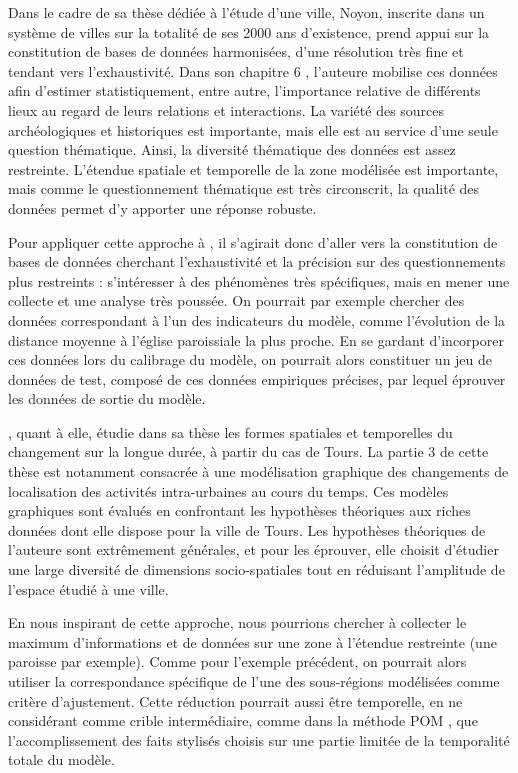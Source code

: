 Dans le cadre de sa thèse dédiée à l'étude d'une ville, Noyon, inscrite dans un système de villes sur la totalité de ses 2000 ans d'existence, \textcite{gravier_deux_2018} prend appui sur la constitution de bases de données harmonisées, d'une résolution très fine et tendant vers l'exhaustivité.
Dans son chapitre 6 \autocite[pp.231--295~]{gravier_deux_2018}, l'auteure mobilise ces données afin d'estimer statistiquement, entre autre, l'importance relative de différents lieux au regard de leurs relations et interactions.
La variété des sources archéologiques et historiques est importante, mais elle est au service d'une seule question thématique.
Ainsi, la diversité thématique des données est assez restreinte.
L'étendue spatiale et temporelle de la zone modélisée est importante, mais comme le questionnement thématique est très circonscrit, la qualité des données permet d'y apporter une réponse robuste.

Pour appliquer cette approche à \simfeodal{}, il s'agirait donc d'aller vers la constitution de bases de données cherchant l'exhaustivité et la précision sur des questionnements plus restreints :
	s'intéresser à des phénomènes très spécifiques, mais en mener une collecte et une analyse très poussée.
On pourrait par exemple chercher des données correspondant à l'un des indicateurs du modèle, comme l'évolution de la distance moyenne à l'église paroissiale la plus proche.
En se gardant d'incorporer ces données lors du calibrage du modèle, on pourrait alors constituer un jeu de données de test, composé de ces données empiriques précises, par lequel éprouver les données de sortie du modèle.

\textcite{nahassia_formes_2019}, quant à elle, étudie dans sa thèse les formes spatiales et temporelles du changement sur la longue durée, à partir du cas de Tours.
La partie 3 \autocite[pp.~239--394]{nahassia_formes_2019} de cette thèse est notamment consacrée à une modélisation graphique des changements de localisation des activités intra-urbaines au cours du temps.
Ces modèles graphiques sont évalués en confrontant les hypothèses théoriques aux riches données dont elle dispose pour la ville de Tours.
Les hypothèses théoriques de l'auteure sont extrêmement générales, et pour les éprouver, elle choisit d'étudier une large diversité de dimensions socio-spatiales tout en réduisant l'amplitude de l'espace étudié à une ville.

En nous inspirant de cette approche, nous pourrions chercher à collecter le maximum d'informations et de données sur une zone à l'étendue restreinte (une paroisse par exemple).
Comme pour l'exemple précédent, on pourrait alors utiliser la correspondance spécifique de l'une des sous-régions modélisées comme critère d'ajustement.
Cette réduction pourrait aussi être temporelle, en ne considérant comme \og crible intermédiaire\fg{}, comme dans la méthode POM \autocite{grimm_pattern-oriented_2005,grimm_pattern-oriented_2012}, que l'accomplissement des faits stylisés choisis sur une partie limitée de la temporalité totale du modèle.

